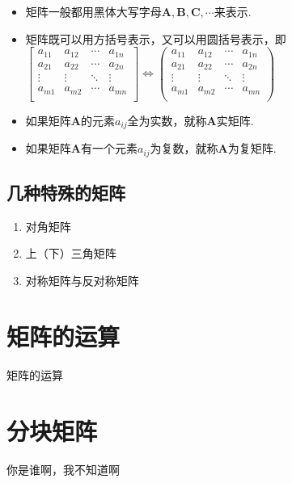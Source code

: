\documentclass[lang=cn,10pt]{elegantbook}
\newcommand{\matA}{\mathbf{A}}
\begin{document}
	\begin{remark}
		\begin{itemize}
			\item 矩阵一般都用黑体大写字母\( \matA, \mathbf{B}, \mathbf{C}, \cdots \)来表示.
			\item 矩阵既可以用方括号表示，又可以用圆括号表示，即\\
				\(
					\begin{bmatrix}
						a_{11} & a_{12} & \cdots & a_{1n} \\
						a_{21} & a_{22} & \cdots & a_{2n} \\
						\vdots & \vdots & \ddots & \vdots \\
						a_{m1} & a_{m2} & \cdots & a_{mn} \\
					\end{bmatrix}
					\Leftrightarrow
					\begin{pmatrix}
						a_{11} & a_{12} & \cdots & a_{1n} \\
						a_{21} & a_{22} & \cdots & a_{2n} \\
						\vdots & \vdots & \ddots & \vdots \\
						a_{m1} & a_{m2} & \cdots & a_{mn} \\
					\end{pmatrix}
				\)
			\item 如果矩阵\( \matA \)的元素\( a_{ij} \)全为实数，就称\( \matA \)实矩阵.
			\item 如果矩阵\( \matA \)有一个元素\( a_{ij} \)为复数，就称\( \matA \)为复矩阵.
		\end{itemize}
	\end{remark}
	
	\subsection{几种特殊的矩阵}
		\begin{enumerate}
			\item 对角矩阵
			\item 上（下）三角矩阵
			\item 对称矩阵与反对称矩阵
		\end{enumerate}
	\section{矩阵的运算}
	矩阵的运算
	\section{分块矩阵}
	你是谁啊，我不知道啊
	
\end{document}
